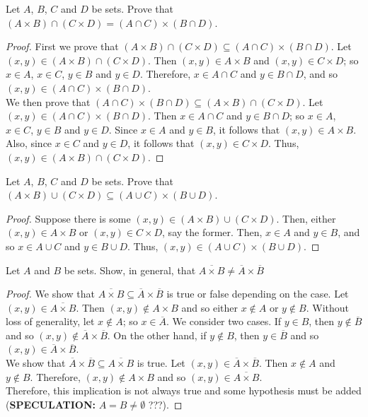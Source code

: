 \documentclass[12pt]{article}
\newenvironment{problem}[2][Problem]{\begin{trivlist}
		\item[\hskip \labelsep {\bfseries #1}\hskip \labelsep {\bfseries #2.}]}{\end{trivlist}}
\begin{document}
	\begin{problem}{68}
		Let $A$, $B$, $C$ and $D$ be sets. Prove that $(A\times B)\cap (C\times D) = (A\cap C)\times (B\cap D)$.
		\begin{proof}
			First we prove that $(A\times B)\cap (C\times D) \subseteq (A\cap C)\times (B\cap D)$. Let $(x,y)\in (A\times B)\cap (C\times D)$. Then $(x,y)\in A\times B$ and $(x,y)\in C\times D$; so $x\in A$, $x\in C$, $y\in B$ and $y\in D$. Therefore, $x\in A\cap C$ and $y\in B\cap D$, and so $(x,y) \in (A\cap C)\times (B\cap D)$.\\
			We then prove that $(A\cap C)\times (B\cap D) \subseteq (A\times B)\cap (C\times D)$. Let $(x,y)\in (A\cap C)\times (B\cap D)$. Then $x\in A\cap C$ and $y\in B\cap D$; so $x\in A$, $x\in C$, $y\in B$ and $y\in D$. Since $x\in A$ and $y\in B$, it follows that $(x,y)\in A\times B$. Also, since $x\in C$ and $y\in D$, it follows that $(x,y)\in C\times D$. Thus, $(x,y)\in (A\times B)\cap (C\times D)$.
		\end{proof}
	\end{problem}

	\begin{problem}{69}
		Let $A$, $B$, $C$ and $D$ be sets. Prove that $(A\times B)\cup (C\times D)\subseteq (A\cup C)\times (B\cup D)$.
		\begin{proof}
			Suppose there is some $(x,y)\in (A\times B)\cup (C\times D)$. Then, either $(x,y)\in A\times B$ or $(x,y)\in C\times D$, say the former. Then, $x\in A$ and $y\in B$, and so $x\in A\cup C$ and $y\in B\cup D$. Thus, $(x,y)\in (A\cup C)\times (B\cup D)$.
		\end{proof}
	\end{problem}

	\begin{problem}{70}
		Let $A$ and $B$ be sets. Show, in general, that $\overline{A\times B} \neq \overline{A}\times \overline{B}$
		\begin{proof}
			We show that $\overline{A\times B} \subseteq \overline{A}\times \overline{B}$ is true or false depending on the case. Let $(x,y)\in \overline{A\times B}$. Then $(x,y)\not\in A\times B$ and so either $x\not\in A$ or $y\not\in B$. Without loss of generality, let $x\not\in A$; so $x\in \overline{A}$. We consider two cases. If $y\in B$, then $y\not\in \overline{B}$ and so $(x,y) \not\in \overline{A}\times \overline{B}$. On the other hand, if $y\not\in B$, then $y\in \overline{B}$ and so $(x,y)\in \overline{A}\times \overline{B}$.\\
			
			We show that $\overline{A}\times \overline{B} \subseteq \overline{A\times B}$ is true. Let $(x,y)\in \overline{A}\times \overline{B}$. Then $x\not\in A$ and $y\not\in B$. Therefore, $(x,y)\not\in A\times B$ and so $(x,y)\in \overline{A\times B}$.\\
			Therefore, this implication is not always true and some hypothesis must be added (\textbf{SPECULATION:} $A=B\neq \emptyset$ ???).
		\end{proof}  
	\end{problem}
\end{document}
